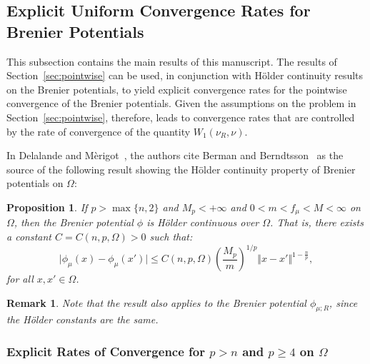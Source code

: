 \documentclass{amsart}
\theoremstyle{lemma}
\newtheorem{proposition}[theorem]{Proposition}
\newtheorem{remark}[theorem]{Remark}
\theoremstyle{remark}
\begin{document}

\subsection{Explicit Uniform Convergence Rates for Brenier Potentials}\label{sec:explicituniform}

This subsection contains the main results of this manuscript. The results of Section~\ref{sec:pointwise} can be used, in conjunction with H\"{o}lder continuity results on the Brenier potentials, to yield explicit convergence rates for the pointwise convergence of the Brenier potentials. Given the assumptions on the problem in Section~\ref{sec:pointwise}, therefore, leads to convergence rates that are controlled by the rate of convergence of the quantity $W_1(\nu_{R} , \nu)$.

In Delalande and M\`{e}rigot~\cite{merigot1}, the authors cite Berman and Berndtsson~\cite{BermanBerndtsson} as the source of the following result showing the H\"{o}lder continuity property of Brenier potentials on $\Omega$:

\begin{proposition}
If $p>\max\{ n, 2\}$ and $M_{p}<+\infty$ and $0<m<f_{\mu}<M<\infty$ on $\Omega$, then the Brenier potential $\phi$ is H\"{o}lder continuous over $\Omega$. That is, there exists a constant $C = C(n, p, \Omega)>0$ such that:
\begin{equation}\label{eq:holder}
\vert \phi_{\mu}(x) - \phi_{\mu}(x') \vert \leq C(n, p, \Omega) \left( \frac{M_{p}}{m} \right)^{1/p} \Vert x - x' \Vert^{1-\frac{n}{p}},
\end{equation}
for all $x, x' \in \Omega$.
\end{proposition}
\begin{remark}
Note that the result also applies to the Brenier potential $\phi_{\mu;R}$, since the H\"{o}lder constants are the same.
\end{remark}

\subsubsection{Explicit Rates of Convergence for $p > n$ and $p \geq 4$ on $\Omega$}
\end{document}
